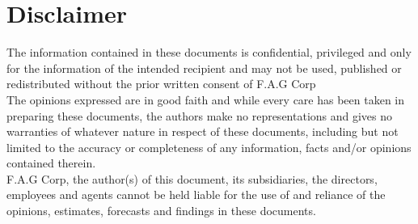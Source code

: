 \documentclass[../main.tex]{subfiles}
\begin{document}
	\section*{Disclaimer}
	The information contained in these documents is confidential, privileged and only for the information of the intended recipient and may not be used, published or redistributed without the prior written consent of F.A.G Corp\\

	The opinions expressed are in good faith and while every care has been taken in preparing these documents, the authors make no representations and gives no warranties of whatever nature in respect of these documents, including but not limited to the accuracy or completeness of any information, facts and/or opinions contained therein.\\

	F.A.G Corp, the author(s) of this document, its subsidiaries, the directors, employees and agents cannot be held liable for the use of and reliance of the opinions, estimates, forecasts and findings in these documents.
	
	\newpage
\end{document}
